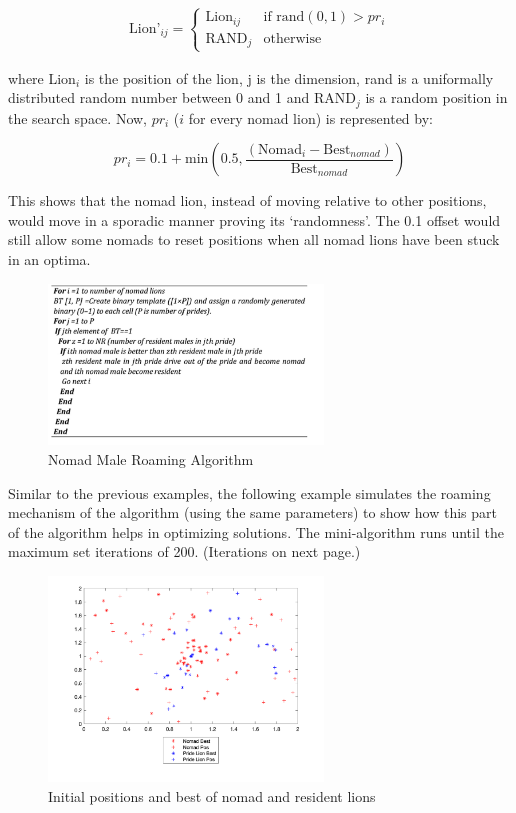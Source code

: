 \begin{align*}
 \text{Lion'}_{ij} =
  \begin{cases}
   \text{Lion}_{ij}        & \text{if rand}(0,1)  > pr_i \\
   \text{RAND}_j        & \text{otherwise}
 \end{cases}
\end{align*}

where Lion$_{i}$ is the position of the lion, j is the dimension, rand is a uniformally distributed random number between 0 and 1 and RAND$_j$ is a random position in the search space. Now, $pr_i$ ($i$ for every nomad lion) is represented by:

$$
pr_i = 0.1 + \text{min}\left(0.5, \frac{ (\text{Nomad}_i - \text{Best}_{nomad}) }{ \text{Best}_{nomad} }\right)
$$

This shows that the nomad lion, instead of moving relative to other positions, would move in a sporadic manner proving its `randomness'. The 0.1 offset would still allow some nomads to reset positions when all nomad lions have been stuck in an optima.

\begin{figure}[h]
\begin{center}
\includegraphics[width=0.65\textwidth]{img/roam/nomad}
\caption{Nomad Male Roaming Algorithm}
\end{center}
\end{figure}

Similar to the previous examples, the following example simulates the roaming mechanism of the algorithm (using the same parameters) to show how this part of the algorithm helps in optimizing solutions. The mini-algorithm runs until the maximum set iterations of 200. (Iterations on next page.)

\begin{figure}[h]
\begin{center}
\includegraphics[width=0.65\textwidth]{img/roam/roam-init}
\caption{Initial positions and best of nomad and resident lions}
\end{center}
\end{figure}

